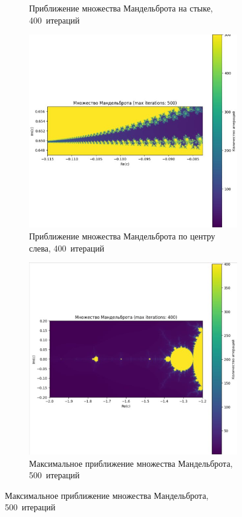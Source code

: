 \begin{figure}[H]
\begin{subfigure}{0.4\textwidth}
        \caption{Приближение множества Мандельброта на стыке, 400~итераций }
    \end{subfigure}
    \hspace{1.7cm}
    \begin{subfigure}{0.4\textwidth}
        \includegraphics[width=\textwidth]{plots/M5.jpg}
        \caption{Приближение множества Мандельброта по центру слева, 400~итераций }
    \end{subfigure}
    \hspace{1.7cm}
    \begin{subfigure}{0.4\textwidth}
        \includegraphics[width=\textwidth]{plots/M6.jpg}
        \caption{Максимальное приближение множества Мандельброта, 500~итераций }
    \end{subfigure}
\end{figure}